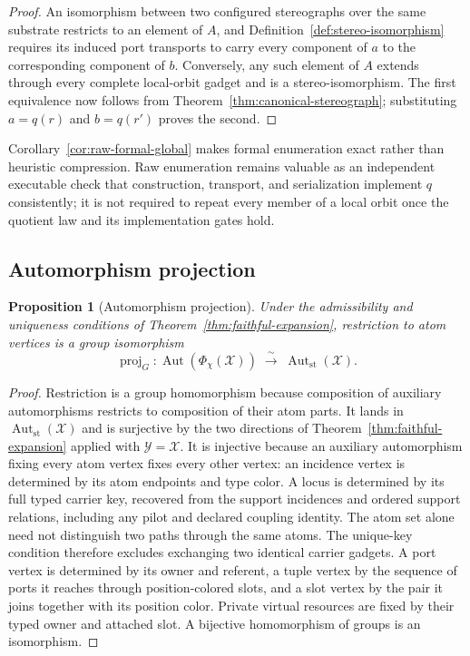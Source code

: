 \documentclass[pdflatex,sn-mathphys-num,referee,lineno]{sn-jnl}
\theoremstyle{plain}
\newtheorem{proposition}[theorem]{Proposition}
\theoremstyle{remark}
\theoremstyle{definition}
\begin{document}
\begin{proof}
An isomorphism between two configured stereographs over the same substrate
restricts to an element of \(A\), and Definition~\ref{def:stereo-isomorphism}
requires its induced port transports to carry every component of \(a\) to the
corresponding component of \(b\).  Conversely, any such element of \(A\)
extends through every complete local-orbit gadget and is a
stereo-isomorphism.  The first equivalence now follows from
Theorem~\ref{thm:canonical-stereograph}; substituting \(a=q(r)\) and
\(b=q(r')\) proves the second.
\end{proof}

Corollary~\ref{cor:raw-formal-global} makes formal enumeration exact rather
than heuristic compression.  Raw enumeration remains valuable as an
independent executable check that construction, transport, and serialization
implement \(q\) consistently; it is not required to repeat every member of a
local orbit once the quotient law and its implementation gates hold.



\subsection{Automorphism projection}

\begin{proposition}[Automorphism projection]
\label{prop:aut-projection}
Under the admissibility and uniqueness conditions of
Theorem~\ref{thm:faithful-expansion}, restriction to atom vertices is a group
isomorphism
\[
  \operatorname{proj}_G:
  \operatorname{Aut}\!\left(\Phi_\chi(\mathcal X)\right)
  \;\xrightarrow{\ \sim\ }\;
  \operatorname{Aut}_{\mathrm{st}}(\mathcal X).
\]
\end{proposition}

\begin{proof}
Restriction is a group homomorphism because composition of auxiliary
automorphisms restricts to composition of their atom parts.  It lands in
\(\operatorname{Aut}_{\mathrm{st}}(\mathcal X)\) and is surjective by the two
directions of Theorem~\ref{thm:faithful-expansion} applied with
\(\mathcal Y=\mathcal X\).  It is injective because an auxiliary automorphism
fixing every atom vertex fixes every other vertex: an incidence vertex is
determined by its atom endpoints and type color. A locus is determined by its
full typed carrier key, recovered from the support incidences and ordered
support relations, including any pilot and declared coupling identity. The
atom set alone need not distinguish two paths through the same atoms. The
unique-key condition therefore excludes exchanging two identical carrier
gadgets. A port vertex is determined by its owner and referent, a tuple vertex
by the sequence of ports it reaches through position-colored slots, and a slot
vertex by the pair it joins together with its position color. Private virtual
resources are fixed by their typed owner and attached slot. A bijective
homomorphism of groups is an isomorphism.
\end{proof}
\end{document}
